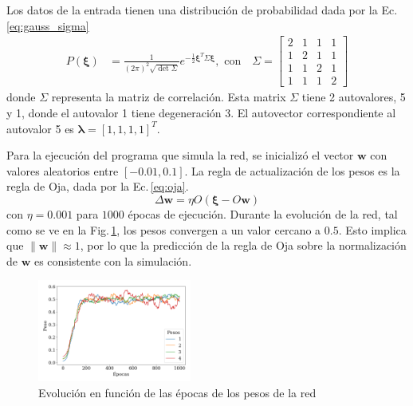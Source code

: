 Los datos de la entrada tienen una distribución de probabilidad dada por la Ec.\,\ref{eq:gauss_sigma}
\begin{align}
	P(\bm  \xi) &= \frac{1}{(2\pi)^2\sqrt{\det{\Sigma}}} e^{-\frac{1}{2} \bm \xi^T \Sigma \bm \xi} \label{eq:gauss_sigma}, \text{ con} \quad
	\Sigma =
	\begin{bmatrix}
	2 &	1 & 1 & 1 \\
	1 &	2 & 1 & 1 \\
	1 &	1 & 2 & 1 \\
	1 &	1 & 1 & 2 
\end{bmatrix}
\end{align}
donde $\Sigma$ representa la matriz de correlación. Esta matrix $\Sigma$ tiene 2 autovalores, 5 y 1, donde el autovalor 1 tiene degeneración 3. El autovector correspondiente al autovalor 5 es $\bm \lambda = [1,1,1,1]^T$.

Para la ejecución del programa que simula la red, se inicializó el vector $\bm w$ con valores aleatorios entre $[-0.01, 0.1]$. La regla de actualización de los pesos es la regla de Oja, dada por la Ec.\,\ref{eq:oja}.
\begin{equation}
	\Delta \bm w = \eta O (\bm \xi - O \bm w) \label{eq:oja}
\end{equation}
con $\eta=0.001$ para $1000$ épocas de ejecución. Durante la evolución de la red, tal como se ve en la Fig.\,\ref{fig:pesos1D}, los pesos convergen a un valor cercano a $0.5$. Esto implica que $\|\bm w \| \approx 1$, por lo que la predicción de la regla de Oja sobre la normalización de $\bm w$ es consistente con la simulación.

\begin{figure}[H]
	\centering
	\includegraphics[width=0.45\textwidth]{../Graficos/todos_los_pesos.png}
	\caption{Evolución en función de las épocas de los pesos de la red}
	\label{fig:pesos1D}
\end{figure}

